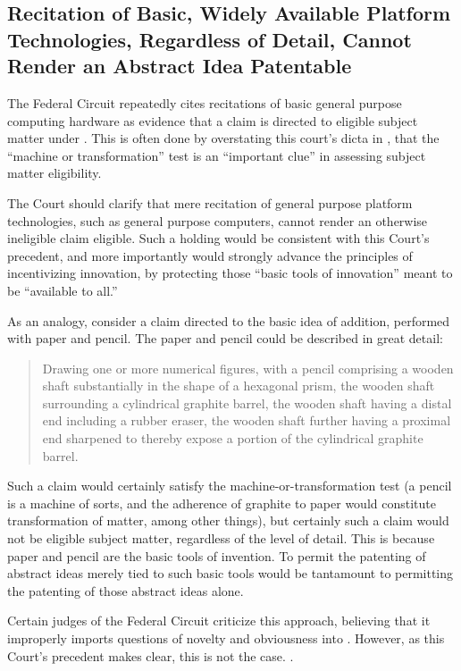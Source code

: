 \documentclass{scotus}
\begin{document}
\subsection{Recitation of Basic, Widely Available Platform Technologies,
Regardless of Detail, Cannot Render an Abstract Idea Patentable}

The Federal Circuit repeatedly cites recitations of basic general purpose
computing hardware as evidence that a claim is directed to eligible
subject matter under . This is often done by overstating this
court's dicta in , that the ``machine or transformation'' test is
an ``important clue'' in assessing subject matter eligibility.

The Court should clarify that mere recitation of general purpose platform
technologies, such as general purpose computers, cannot render an otherwise
ineligible claim eligible. Such a holding would be consistent with this Court's
precedent, and more importantly would strongly advance the principles of
incentivizing innovation, by protecting those ``basic tools of innovation''
meant to be ``available to all.''

As an analogy, consider a claim directed to the basic idea of addition,
performed with paper and pencil. The paper and pencil could be described in
great detail:
\begin{quote}
Drawing one or more numerical figures, with a pencil comprising a wooden shaft
substantially in the shape of a hexagonal prism, the wooden shaft surrounding a
cylindrical graphite barrel, the wooden shaft having a distal end including a
rubber eraser, the wooden shaft further having a proximal end sharpened to
thereby expose a portion of the cylindrical graphite barrel.
\end{quote}
Such a claim would certainly satisfy the machine-or-transformation test (a
pencil is a machine of sorts, and the adherence of graphite to paper would
constitute transformation of matter, among other things), but certainly such a
claim would not be eligible subject matter, regardless of the level of detail.
This is because paper and pencil are the basic tools of invention. To permit the
patenting of abstract ideas merely tied to such basic tools would be tantamount
to permitting the patenting of those abstract ideas alone.

Certain judges of the Federal Circuit criticize this approach, believing that it
improperly imports questions of novelty and obviousness into .
However, as this Court's precedent makes clear, this is not the case.
.
\end{document}
